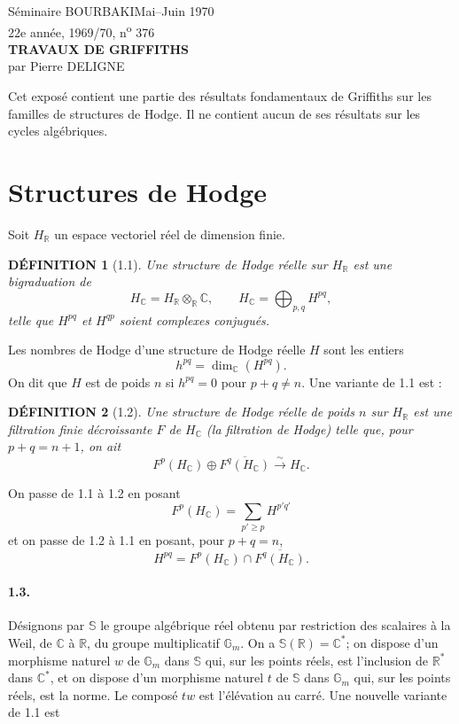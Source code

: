 \documentclass[10pt]{article}
\newcommand{\C}{\mathbb C}
\newcommand{\R}{\mathbb R}
\newcommand{\Gm}{\mathbb G_m}
\newcommand{\bS}{\mathbb S}
\theoremstyle{deligne}
\newtheorem*{definition}{DÉFINITION}
\begin{document}
\begin{center}
Séminaire BOURBAKI\hfill Mai--Juin 1970\\
22e année, 1969/70, n\textsuperscript{o} 376\\[2.2em]
{\Large\bfseries TRAVAUX DE GRIFFITHS}\\[1.2em]
par Pierre DELIGNE
\end{center}

Cet exposé contient une partie des résultats fondamentaux de Griffiths sur les familles de structures de Hodge. Il ne contient aucun de ses résultats sur les cycles algébriques.

\section{Structures de Hodge}

Soit $H_\R$ un espace vectoriel réel de dimension finie.

\begin{definition}[1.1]
Une structure de Hodge réelle sur $H_\R$ est une bigraduation de
\[
H_\C=H_\R\otimes_\R\C,
\qquad
H_\C=\bigoplus_{p,q}H^{pq},
\]
telle que $H^{pq}$ et $H^{qp}$ soient complexes conjugués.
\end{definition}

Les nombres de Hodge d'une structure de Hodge réelle $H$ sont les entiers
\[
h^{pq}=\dim_\C(H^{pq}).
\]
On dit que $H$ est de poids $n$ si $h^{pq}=0$ pour $p+q\ne n$. Une variante de 1.1 est :

\begin{definition}[1.2]
Une structure de Hodge réelle de poids $n$ sur $H_\R$ est une filtration finie décroissante $F$ de $H_\C$ (la filtration de Hodge) telle que, pour $p+q=n+1$, on ait
\begin{equation}
F^p(H_\C)\oplus \overline{F^q(H_\C)}\xrightarrow{\sim}H_\C .
\tag{1.2.1}
\end{equation}
\end{definition}

On passe de 1.1 à 1.2 en posant
\begin{equation}
F^p(H_\C)=\sum_{p'\ge p}H^{p'q'}
\tag{1.2.2}
\end{equation}
et on passe de 1.2 à 1.1 en posant, pour $p+q=n$,
\begin{equation}
H^{pq}=F^p(H_\C)\cap \overline{F^q(H_\C)} .
\tag{1.2.3}
\end{equation}

\paragraph{1.3.}
Désignons par $\bS$ le groupe algébrique réel obtenu par restriction des scalaires à la Weil, de $\C$ à $\R$, du groupe multiplicatif $\Gm$. On a $\bS(\R)=\C^*$; on dispose d'un morphisme naturel $w$ de $\Gm$ dans $\bS$ qui, sur les points réels, est l'inclusion de $\R^*$ dans $\C^*$, et on dispose d'un morphisme naturel $t$ de $\bS$ dans $\Gm$ qui, sur les points réels, est la norme. Le composé $tw$ est l'élévation au carré. Une nouvelle variante de 1.1 est
\end{document}
